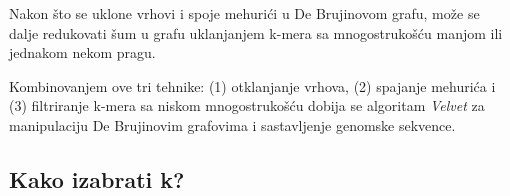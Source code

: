 \documentclass[12pt,oneside]{memoir}
\begin{document}
\begin{comment}
\begin{figure}[!ht]
\centering
\texttt{[image: Figura5\_22.PNG]}
\caption{Ovaj primer ilustruje kako algoritam turneje obilazi De Brujinov graf. Radi jasnoće, svaki čvor pokazuje poslednju bazu svojih k-mera i odgovarajući celobrojni stepen je njegova mnogostrukost. Algoritam izvodi pretragu u dobinu (BFS) i BFS stablo je prikazano podebljanim ivicama. Na slici (a) postoje 2 (ugnježdena) mehurića. Na slici (b) se izvodi BFS počevši od $r$. Kada se poseti $u$, dete $v$ od $u$ je posećeno. Identifikuje se mehurić i vrši se njegovo spajanje. Zatim, dobija se slika (c). Na slici (c) se nastavlja izvođenje BFS algoritma. Kada se posete $u'$, dete $v'$ od $u'$ je posećeno. Identifikuje se drugi mehurić i vrši se njegovo spajanje. Zatim se dobija slika (d). Na slici (d) se nastavlja izvođenje BFS algoritma. Kako se ne može identifikovati više nijedan mehurić, algoritam se završava.}
\label{fig:15}
\source{\cite{WingKinSung}}
\end{figure}

\end{comment}

Nakon što se uklone vrhovi i spoje mehurići u De Brujinovom grafu, može se dalje redukovati šum u grafu uklanjanjem k-mera sa mnogostrukošću manjom ili jednakom nekom pragu. 

Kombinovanjem ove tri tehnike: (1) otklanjanje vrhova, (2) spajanje mehurića i (3) filtriranje k-mera sa niskom mnogostrukošću dobija se algoritam \textit{Velvet} \cite{Velvet} za manipulaciju De Brujinovim grafovima i sastavljenje genomske sekvence.

\begin{comment}

i njegov psoudokod je prikazan na slici \ref{fig:16}.

\begin{figure}[!ht]
\centering
\texttt{[image: Figura5\_23.PNG]}
\caption{Algoritam za otklanjanje grešaka sekvencioniranja \cite{WingKinSung}}
\label{fig:16}
\end{figure}

\end{comment}

\newpage

\subsection{Kako izabrati k?}
\label{poglavlje:IspravnoK}
\end{document}

